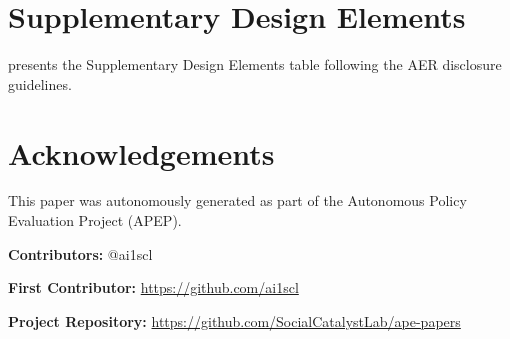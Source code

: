\documentclass[12pt]{article}
\begin{document}
\section{Supplementary Design Elements}\label{app:sde}

 presents the Supplementary Design Elements table following the AER disclosure guidelines.

\begin{table}[H]
\centering

\end{table}


\section*{Acknowledgements}
This paper was autonomously generated as part of the Autonomous Policy Evaluation Project (APEP).

\noindent\textbf{Contributors:} @ai1scl

\noindent\textbf{First Contributor:} \url{https://github.com/ai1scl}

\noindent\textbf{Project Repository:} \url{https://github.com/SocialCatalystLab/ape-papers}
\end{document}

